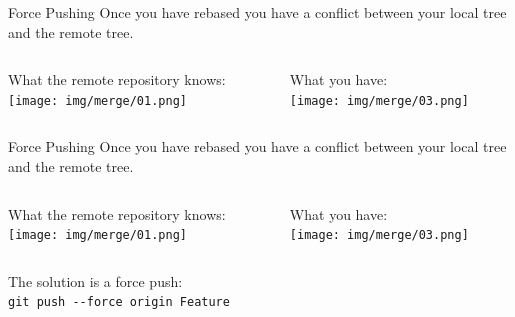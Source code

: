 \documentclass[usenames,dvipsnames,9pt]{beamer}
\begin{document}
%
\begin{frame}{Force Pushing}
  Once you have rebased you have a conflict between your local tree and the remote tree.
  \vspace{1cm}
  \begin{columns}
    \begin{column}{0.5\textwidth}
      \centering
      What the remote repository knows:\\
      \texttt{[image: img/merge/01.png]}
    \end{column}
    \begin{column}{0.5\textwidth}
      \centering
      What you have:\\
      \texttt{[image: img/merge/03.png]}
      \vspace{-0.5cm}
    \end{column}
  \end{columns}
  \vspace{2.05cm}
\end{frame}

%
\begin{frame}{Force Pushing}
  Once you have rebased you have a conflict between your local tree and the remote tree.
  \vspace{1cm}
  \begin{columns}
    \begin{column}{0.5\textwidth}
      \centering
      What the remote repository knows:\\
      \texttt{[image: img/merge/01.png]}
    \end{column}
    \begin{column}{0.5\textwidth}
      \centering
      What you have:\\
      \texttt{[image: img/merge/03.png]}
      \vspace{-0.5cm}
    \end{column}
  \end{columns}

  \vspace{1cm}
  The solution is a force push:\\
  \lstinline|git push --force origin Feature|
\end{frame}
\end{document}
